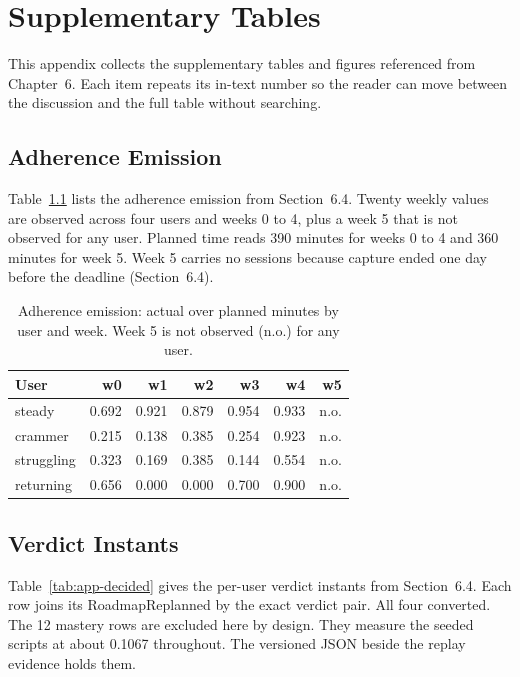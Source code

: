 \chapter{Supplementary Tables}
\label{ch:appendix}
This appendix collects the supplementary tables and figures referenced from Chapter~6. Each item repeats its in-text number so the reader can move between the discussion and the full table without searching.

\section{Adherence Emission}
Table~\ref{tab:app-adherence} lists the adherence emission from Section~6.4. Twenty weekly values are observed across four users and weeks 0 to 4, plus a week 5 that is not observed for any user. Planned time reads 390 minutes for weeks 0 to 4 and 360 minutes for week 5. Week 5 carries no sessions because capture ended one day before the deadline (Section~6.4).

\begin{table}[htbp]
\centering
\footnotesize
\caption{Adherence emission: actual over planned minutes by user and week. Week 5 is not observed (n.o.) for any user.}
\label{tab:app-adherence}
\begin{tabular}{l r r r r r r}
\toprule
\textbf{User} & \textbf{w0} & \textbf{w1} & \textbf{w2} & \textbf{w3} & \textbf{w4} & \textbf{w5} \\
\midrule
steady & 0.692 & 0.921 & 0.879 & 0.954 & 0.933 & n.o. \\
crammer & 0.215 & 0.138 & 0.385 & 0.254 & 0.923 & n.o. \\
struggling & 0.323 & 0.169 & 0.385 & 0.144 & 0.554 & n.o. \\
returning & 0.656 & 0.000 & 0.000 & 0.700 & 0.900 & n.o. \\
\bottomrule
\end{tabular}
\end{table}

\section{Verdict Instants}
Table~\ref{tab:app-decided} gives the per-user verdict instants from Section~6.4. Each row joins its RoadmapReplanned by the exact verdict pair. All four converted. The 12 mastery rows are excluded here by design. They measure the seeded scripts at about 0.1067 throughout. The versioned JSON beside the replay evidence holds them.

